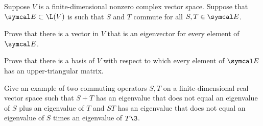 \begin{exercises}
\exercise
Suppose $V$ is a finite-dimensional nonzero complex vector space. Suppose that $\E \subset \L(V)$ is such that $S$ and $T$ commute for all $S, T \in \E$. \label{4ManyOps}
\begin{subtheorem}
\item
Prove that there is a vector in $V$ that is an eigenvector for every element of $\E$.
\item
Prove that there is a basis of $V$ with respect to which every element of $\E$ has an upper-triangular matrix.
\end{subtheorem}
%


\exercise
Give an example of two commuting operators $S, T$ on a finite-dimensional real vector space such that $S+T$ has an eigenvalue that does not equal an eigenvalue of $S$ plus an eigenvalue of $T$ and $ST$ has an eigenvalue that does not equal an eigenvalue of $S$ times an eigenvalue of $T\3$.


\end{exercises}

\endinput 

